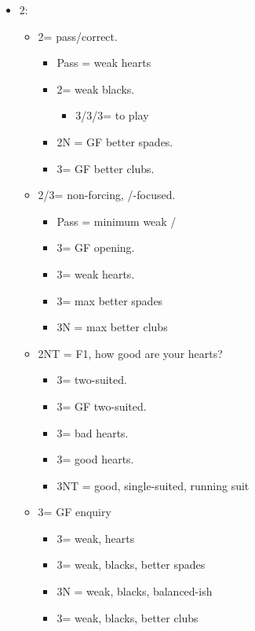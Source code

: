 \documentclass[a4paper,14pt]{extarticle}
\begin{document}
\begin{itemize}
\begin{itemize}
	\end{itemize}

\newpage

\item 2\diamonds:
	\begin{itemize}
   \item 2\hearts = pass/correct.
		\begin{itemize}
		\item Pass = weak hearts
      \item 2\spades = weak blacks.
			\begin{itemize}
			\item 3\clubs/3\diamonds/3\hearts = to play
			\end{itemize}
      \item 2N = GF better spades.
      \item 3\clubs = GF better clubs.
		\end{itemize}
   \item 2\spades/3\clubs = non-forcing, \clubs/\spades-focused.
		\begin{itemize}
		\item Pass = minimum weak \clubs/\spades
      \item 3\diamonds = GF opening.
      \item 3\hearts = weak hearts.
		\item 3\spades = max better spades
		\item 3N = max better clubs
		\end{itemize}
   \item 2NT = F1, how good are your hearts?
		\begin{itemize}
      \item 3\clubs = two-suited.
      \item 3\diamonds = GF two-suited.
      \item 3\hearts = bad hearts.
      \item 3\spades = good hearts.
      \item 3NT = good, single-suited, running suit
		\end{itemize}
	\item 3\diamonds = GF enquiry
		\begin{itemize}
		\item 3\hearts = weak, hearts
		\item 3\spades = weak, blacks, better spades
		\item 3N = weak, blacks, balanced-ish
		\item 3\clubs = weak, blacks, better clubs
		\end{itemize}
	\end{itemize}


\end{itemize}
\end{document}
